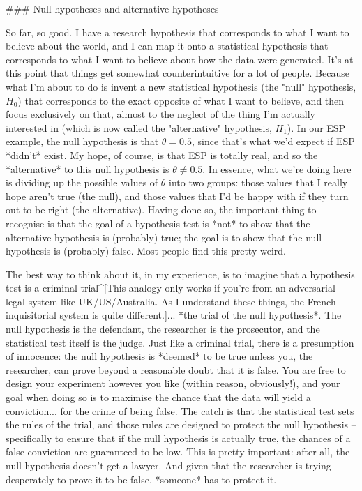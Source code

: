 ### Null hypotheses and alternative hypotheses

So far, so good. I have a research hypothesis that corresponds to what I want to believe about the world, and I can map it onto a statistical hypothesis that corresponds to what I want to believe about how the data were generated. It's at this point that things get somewhat counterintuitive for a lot of people. Because what I'm about to do is invent a new statistical hypothesis (the "null" hypothesis, $H_0$) that corresponds to the exact opposite of what I want to believe, and then focus exclusively on that, almost to the neglect of the thing I'm actually interested in (which is now called the "alternative" hypothesis, $H_1$). In our ESP example, the  null hypothesis is that $\theta = 0.5$, since that's what we'd expect if ESP *didn't* exist. My hope, of course, is that ESP is totally real, and so the *alternative* to this null hypothesis is $\theta \neq 0.5$. In essence, what we're doing here is dividing up the possible values of $\theta$ into two groups: those values that I really hope aren't true (the null), and those values that I'd be happy with if they turn out to be right (the alternative). Having done so, the important thing to recognise is that the goal of a hypothesis test is *not* to show that the alternative hypothesis is (probably) true; the goal is to show that the null hypothesis is (probably) false. Most people find this pretty weird. 

The best way to think about it, in my experience, is to imagine that a hypothesis test is a criminal trial^[This analogy only works if you're from an adversarial legal system like UK/US/Australia. As I understand these things, the French inquisitorial system is quite different.]... *the trial of the null hypothesis*. The null hypothesis is the defendant, the researcher is the prosecutor, and the statistical test itself is the judge. Just like a criminal trial, there is a presumption of innocence: the null hypothesis is *deemed* to be true unless you, the researcher, can prove beyond a reasonable doubt that it is false. You are free to design your experiment however you like (within reason, obviously!), and your goal when doing so is to maximise the chance that the data will yield a conviction... for the crime of being false. The catch is that the statistical test sets the rules of the trial, and those rules are designed to protect the null hypothesis -- specifically to ensure that if the null hypothesis is actually true, the chances of a false conviction are guaranteed to be low. This is pretty important: after all, the null hypothesis doesn't get a lawyer. And given that the researcher is trying desperately to prove it to be false, *someone* has to protect it.  



